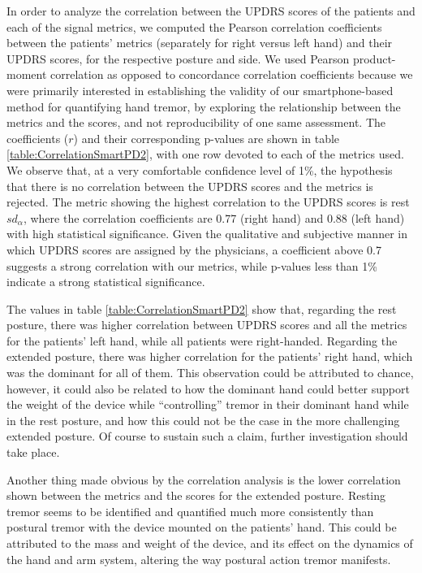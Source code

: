 \noindent
In order to analyze the correlation between the \gls{UPDRS} scores of the patients and each of the signal metrics, we computed the Pearson correlation coefficients between the patients' metrics (separately for right versus left hand) and their \gls{UPDRS} scores, for the respective posture and side. We used Pearson product-moment correlation as opposed to concordance correlation coefficients because we were primarily interested in establishing the validity of our smartphone-based method for quantifying hand tremor, by exploring the relationship between the metrics and the scores, and not reproducibility of one same assessment. The coefficients ($r$) and their corresponding p-values are shown in table \ref{table:CorrelationSmartPD2}, with one row devoted to each of the metrics used. We observe that, at a very comfortable confidence level of 1\%, the hypothesis that there is no correlation between the UPDRS scores and the metrics is rejected. The metric showing the highest correlation to the UPDRS scores is rest $sd_{\alpha}$, where the correlation coefficients are 0.77 (right hand) and 0.88 (left hand) with high statistical significance. Given the qualitative and subjective manner in which \gls{UPDRS} scores are assigned by the physicians, a coefficient above 0.7 suggests a strong correlation with our metrics, while p-values less than 1\% indicate a strong statistical significance.

The values in table \ref{table:CorrelationSmartPD2} show that, regarding the rest posture, there was higher correlation between \gls{UPDRS} scores and all the metrics for the patients' left hand, while all patients were right-handed. Regarding the extended posture, there was higher correlation for the patients' right hand, which was the dominant for all of them. This observation could be attributed to chance, however, it could also be related to how the dominant hand could better support the weight of the device while ``controlling'' tremor in their dominant hand while in the rest posture, and how this could not be the case in the more challenging extended posture. Of course to sustain such a claim, further investigation should take place. 

Another thing made obvious by the correlation analysis is the lower correlation shown between the metrics and the scores for the extended posture. Resting tremor seems to be identified and quantified much more consistently than postural tremor with the device mounted on the patients' hand. This could be attributed to the mass and weight of the device, and its effect on the dynamics of the hand and arm system, altering the way postural action tremor manifests. 

